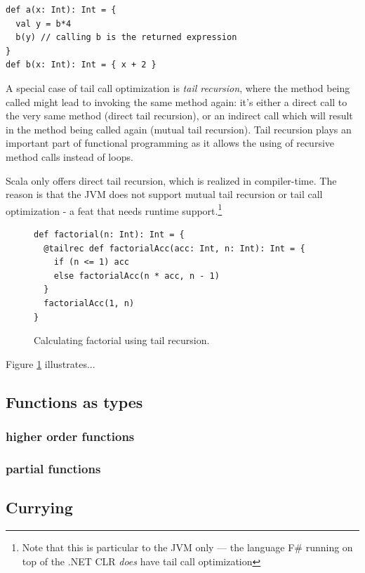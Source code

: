 \begin{lstlisting}
def a(x: Int): Int = { 
  val y = b*4
  b(y) // calling b is the returned expression 
} 
def b(x: Int): Int = { x + 2 }
\end{lstlisting} 

A special case of tail call optimization is \emph{tail recursion}, where the method being called might lead to invoking the same method again: it's either a direct call to the very same method (direct tail recursion), or an indirect call which will result in the method being called again (mutual tail recursion). Tail recursion plays an important part of functional programming as it allows the using of recursive method calls instead of loops.

Scala only offers direct tail recursion, which is realized in compiler-time. The reason is that the JVM does not support mutual tail recursion or tail call optimization - a feat that needs runtime support.\footnote{Note that this is particular to the JVM only --- the language F\# running on top of the .NET CLR \emph{does} have tail call optimization}

\begin{figure}[h!] 
\begin{lstlisting}
def factorial(n: Int): Int = {
  @tailrec def factorialAcc(acc: Int, n: Int): Int = {
    if (n <= 1) acc
    else factorialAcc(n * acc, n - 1)
  }
  factorialAcc(1, n)
}
\end{lstlisting}
\caption{Calculating factorial using tail recursion.}
\label{fig:example_scala_tailrec}
\end{figure}

Figure \ref{fig:example_scala_tailrec} illustrates...

\subsection{Functions as types}
\subsubsection{higher order functions}
\subsubsection{partial functions}

\subsection{Currying}

